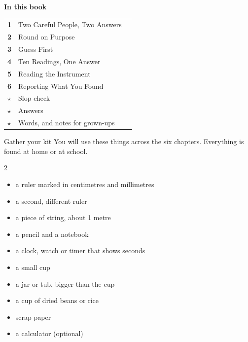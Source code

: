 \thispagestyle{plain}
{\sans\bfseries\LARGE\color{ink} In this book}\par\vspace{0.2cm}
{\sans\large
\begin{tabular}{@{}p{0.9cm}p{7.6cm}r@{}}
\textcolor{tangerine}{\bfseries 1} & Two Careful People, Two Answers & \pageref{ch1}\\[3pt]
\textcolor{tangerine}{\bfseries 2} & Round on Purpose & \pageref{ch2}\\[3pt]
\textcolor{tangerine}{\bfseries 3} & Guess First & \pageref{ch3}\\[3pt]
\textcolor{tangerine}{\bfseries 4} & Ten Readings, One Answer & \pageref{ch4}\\[3pt]
\textcolor{tangerine}{\bfseries 5} & Reading the Instrument & \pageref{ch5}\\[3pt]
\textcolor{tangerine}{\bfseries 6} & Reporting What You Found & \pageref{ch6}\\[3pt]
\textcolor{sky}{\bfseries $\star$} & Slop check & \pageref{slop}\\[3pt]
\textcolor{sky}{\bfseries $\star$} & Answers & \pageref{answers}\\[3pt]
\textcolor{sky}{\bfseries $\star$} & Words, and notes for grown-ups & \pageref{notes}\\
\end{tabular}}

\begin{tryit}{Gather your kit}
You will use these things across the six chapters. Everything is found at home or at school.
\begin{multicols}{2}
\begin{itemize}[leftmargin=1.2em]
\item a ruler marked in centimetres and millimetres
\item a second, different ruler
\item a piece of string, about 1 metre
\item a pencil and a notebook
\item a clock, watch or timer that shows seconds
\item a small cup
\item a jar or tub, bigger than the cup
\item a cup of dried beans or rice
\item scrap paper
\item a calculator (optional)
\end{itemize}
\end{multicols}
\end{tryit}

